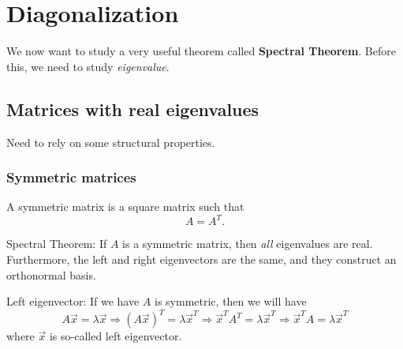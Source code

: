 \section{Diagonalization}
We now want to study a very useful theorem called \textbf{Spectral Theorem}. Before this, we need to study \emph{eigenvalue}.
\subsection{Matrices with real eigenvalues}
Need to rely on some structural properties.

\subsubsection{Symmetric matrices}
\begin{definition}
	A symmetric matrix is a square matrix such that
	\[
		A = A^{T}.
	\]
\end{definition}

\begin{theorem}
	\label{Spectral Theorem}
	Spectral Theorem: If $A$ is a symmetric matrix, then \emph{all} eigenvalues are real. Furthermore, the left and right
	eigenvectors are the same, and they construct an orthonormal basis.
\end{theorem}

\begin{definition}
	Left eigenvector: If we have $A$ is symmetric, then we will have
	\[
		A \vec{x} = \lambda \vec{x}\Rightarrow
		(A \vec{x})^T = \lambda \vec{x}^T\Rightarrow
		\vec{x}^T A^T = \lambda\vec{x}^T\Rightarrow
		\vec{x}^T A = \lambda\vec{x}^T
	\]
	where $\vec{x}$ is so-called left eigenvector.
\end{definition}

